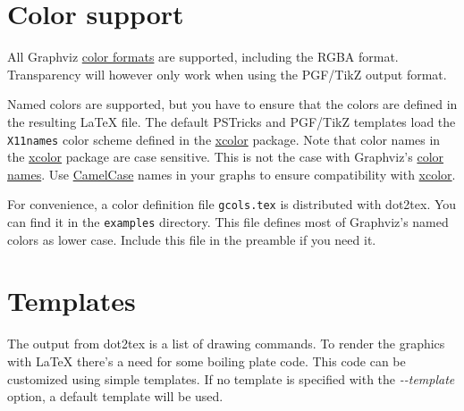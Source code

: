 \documentclass[10pt,a4paper,english]{article}
\newcommand{\titlereference}[1]{\textsl{#1}}
\begin{document}

\hypertarget{color-support}{}
\section*{Color support}
\label{color-support}

All Graphviz \href{http://www.graphviz.org/doc/info/attrs.html\#k:color}{color formats} are supported, including the RGBA format. Transparency will however only work when using the PGF/TikZ output format.

Named colors are supported, but you have to ensure that the colors are defined in the resulting LaTeX file. The default PSTricks and PGF/TikZ templates load the \texttt{X11names} color scheme defined in the \href{http://www.ctan.org/tex-archive/help/Catalogue/entries/xcolor.html}{xcolor} package. Note that color names in the \href{http://www.ctan.org/tex-archive/help/Catalogue/entries/xcolor.html}{xcolor} package are case sensitive. This is not the case with Graphviz's \href{http://www.graphviz.org/doc/info/colors.html}{color names}. Use \href{http://en.wikipedia.org/wiki/CamelCase}{CamelCase}  names in your graphs to ensure compatibility with \href{http://www.ctan.org/tex-archive/help/Catalogue/entries/xcolor.html}{xcolor}.

For convenience, a color definition file \texttt{gcols.tex} is distributed with dot2tex. You can find it in the \texttt{examples} directory. This file defines most of Graphviz's named colors as lower case. Include this file in the preamble if you need it.



\hypertarget{templates}{}
\section*{Templates}
\label{templates}

The output from dot2tex is a list of drawing commands. To render the graphics with LaTeX there's a need for some boiling plate code. This code can be customized using simple templates. If no template is specified with the \titlereference{-{}-template} option, a default template will be used.
\end{document}
